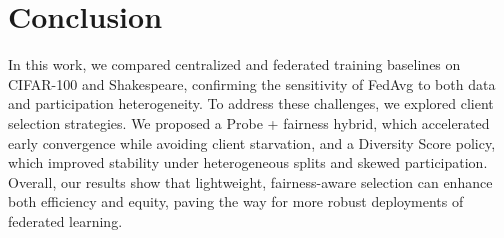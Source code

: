 \documentclass[10pt,twocolumn,letterpaper]{article}
\begin{document}
\section{Conclusion}
In this work, we compared centralized and federated training baselines on CIFAR-100 and Shakespeare, confirming the sensitivity of FedAvg to both data and participation heterogeneity. To address these challenges, we explored client selection strategies. We proposed a Probe + fairness hybrid, which accelerated early convergence while avoiding client starvation, and a Diversity Score policy, which improved stability under heterogeneous splits and skewed participation. Overall, our results show that lightweight, fairness-aware selection can enhance both efficiency and equity, paving the way for more robust deployments of federated learning.














{\scriptsize
\setlength{\itemsep}{0pt}


}
\end{document}

